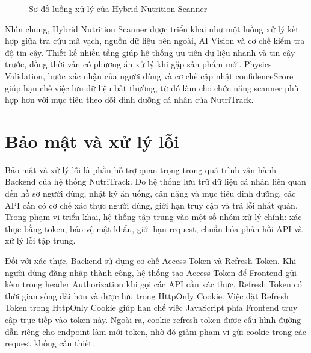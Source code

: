 \documentclass[12pt, a4paper]{report}
\begin{document}
\begin{figure}[!htbp]
    \caption{Sơ đồ luồng xử lý của Hybrid Nutrition Scanner}
    \label{fig:hybrid_scanner_flow}
\end{figure}

Nhìn chung, Hybrid Nutrition Scanner được triển khai như một luồng xử lý kết hợp giữa tra cứu mã vạch, nguồn dữ liệu bên ngoài, AI Vision và cơ chế kiểm tra độ tin cậy. Thiết kế nhiều tầng giúp hệ thống ưu tiên dữ liệu nhanh và tin cậy trước, đồng thời vẫn có phương án xử lý khi gặp sản phẩm mới. Physics Validation, bước xác nhận của người dùng và cơ chế cập nhật confidenceScore giúp hạn chế việc lưu dữ liệu bất thường, từ đó làm cho chức năng scanner phù hợp hơn với mục tiêu theo dõi dinh dưỡng cá nhân của NutriTrack.
\section{Bảo mật và xử lý lỗi}Bảo mật và xử lý lỗi là phần hỗ trợ quan trọng trong quá trình vận hành Backend của hệ thống NutriTrack. Do hệ thống lưu trữ dữ liệu cá nhân liên quan đến hồ sơ người dùng, nhật ký ăn uống, cân nặng và mục tiêu dinh dưỡng, các API cần có cơ chế xác thực người dùng, giới hạn truy cập và trả lỗi nhất quán. Trong phạm vi triển khai, hệ thống tập trung vào một số nhóm xử lý chính: xác thực bằng token, bảo vệ mật khẩu, giới hạn request, chuẩn hóa phản hồi API và xử lý lỗi tập trung.

Đối với xác thực, Backend sử dụng cơ chế Access Token và Refresh Token. Khi người dùng đăng nhập thành công, hệ thống tạo Access Token để Frontend gửi kèm trong header Authorization khi gọi các API cần xác thực. Refresh Token có thời gian sống dài hơn và được lưu trong HttpOnly Cookie. Việc đặt Refresh Token trong HttpOnly Cookie giúp hạn chế việc JavaScript phía Frontend truy cập trực tiếp vào token này. Ngoài ra, cookie refresh token được cấu hình đường dẫn riêng cho endpoint làm mới token, nhờ đó giảm phạm vi gửi cookie trong các request không cần thiết.
\end{document}
